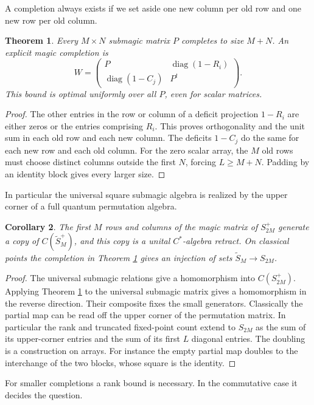 \documentclass[11pt,a4paper]{article}
\newtheorem{thm}{Theorem}[section]
\newtheorem{cor}[thm]{Corollary}
\begin{document}
A completion always exists if we set aside one new column per old row and one new row per old column.

\begin{thm}\label{double}
Every $M\times N$ submagic matrix $P$ completes to size $M+N$. An explicit magic completion is
\[
 W=\begin{pmatrix}P&\operatorname{diag}(1-R_i)\\
           \operatorname{diag}(1-C_j)&P^t\end{pmatrix}.
\]
This bound is optimal uniformly over all $P$, even for scalar matrices.
\end{thm}
\begin{proof}
The other entries in the row or column of a deficit projection $1-R_i$ are either zeros or the entries comprising $R_i$. This proves orthogonality and the unit sum in each old row and each new column. The deficits $1-C_j$ do the same for each new row and each old column. For the zero scalar array, the $M$ old rows must choose distinct columns outside the first $N$, forcing $L\geq M+N$. Padding by an identity block gives every larger size.
\end{proof}

In particular the universal square submagic algebra is realized by the upper corner of a full quantum permutation algebra.

\begin{cor}\label{corner}
The first $M$ rows and columns of the magic matrix of $S_{2M}^+$ generate a copy of $C(\widetilde S_M^+)$, and this copy is a unital $C^*$-algebra retract. On classical points the completion in Theorem \ref{double} gives an injection of sets $\widetilde S_M\to S_{2M}$.
\end{cor}
\begin{proof}
The universal submagic relations give a homomorphism into $C(S_{2M}^+)$. Applying Theorem \ref{double} to the universal submagic matrix gives a homomorphism in the reverse direction. Their composite fixes the small generators. Classically the partial map can be read off the upper corner of the permutation matrix. In particular the rank and truncated fixed-point count extend to $S_{2M}$ as the sum of its upper-corner entries and the sum of its first $L$ diagonal entries. The doubling is a construction on arrays. For instance the empty partial map doubles to the interchange of the two blocks, whose square is the identity.
\end{proof}

For smaller completions a rank bound is necessary. In the commutative case it decides the question.
\end{document}
